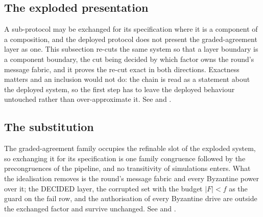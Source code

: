 \subsection{The exploded presentation}

A sub-protocol may be exchanged for its specification where it is a component of a composition, and the deployed protocol does not present the graded-agreement layer as one.
This subsection re-cuts the same system so that a layer boundary is a component boundary, the cut being decided by which factor owns the round's message fabric, and it proves the re-cut exact in both directions.
Exactness matters and an inclusion would not do: the chain is read as a statement about the deployed system, so the first step has to leave the deployed behaviour untouched rather than over-approximate it.
See  and .








\subsection{The substitution}

The graded-agreement family occupies the refinable slot of the exploded system, so exchanging it for its specification is one family congruence followed by the precongruences of the pipeline, and no transitivity of simulations enters.
What the idealisation removes is the round's message fabric and every Byzantine power over it; the DECIDED layer, the corrupted set with the budget $|F| < f$ as the guard on the $\mathrm{fail}$ row, and the authorisation of every Byzantine drive are outside the exchanged factor and survive unchanged.
See  and .

